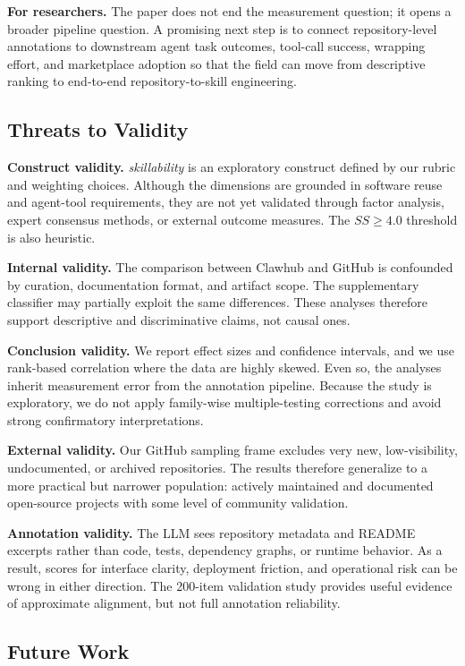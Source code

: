 \documentclass[sigconf,review,anonymous,nonacm]{acmart}
\newcommand{\skillability}{\textit{skillability}\xspace}
\newcommand{\sscore}{\textit{SS}\xspace}
\begin{document}
\textbf{For researchers.} The paper does not end the measurement question; it opens a broader pipeline question. A promising next step is to connect repository-level annotations to downstream agent task outcomes, tool-call success, wrapping effort, and marketplace adoption so that the field can move from descriptive ranking to end-to-end repository-to-skill engineering.

\subsection{Threats to Validity}

\textbf{Construct validity.} \skillability is an exploratory construct defined by our rubric and weighting choices. Although the dimensions are grounded in software reuse and agent-tool requirements, they are not yet validated through factor analysis, expert consensus methods, or external outcome measures. The \(\sscore \ge 4.0\) threshold is also heuristic.

\textbf{Internal validity.} The comparison between Clawhub and GitHub is confounded by curation, documentation format, and artifact scope. The supplementary classifier may partially exploit the same differences. These analyses therefore support descriptive and discriminative claims, not causal ones.

\textbf{Conclusion validity.} We report effect sizes and confidence intervals, and we use rank-based correlation where the data are highly skewed. Even so, the analyses inherit measurement error from the annotation pipeline. Because the study is exploratory, we do not apply family-wise multiple-testing corrections and avoid strong confirmatory interpretations.

\textbf{External validity.} Our GitHub sampling frame excludes very new, low-visibility, undocumented, or archived repositories. The results therefore generalize to a more practical but narrower population: actively maintained and documented open-source projects with some level of community validation.

\textbf{Annotation validity.} The LLM sees repository metadata and README excerpts rather than code, tests, dependency graphs, or runtime behavior. As a result, scores for interface clarity, deployment friction, and operational risk can be wrong in either direction. The 200-item validation study provides useful evidence of approximate alignment, but not full annotation reliability.

\subsection{Future Work}
\end{document}
